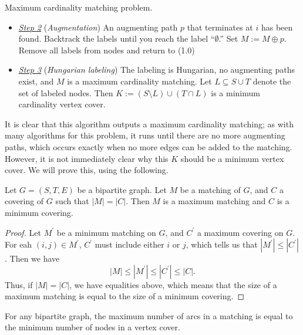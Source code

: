 \documentclass[11pt]{article}
\renewcommand{\'}{^{'}}
\newenvironment{theorem}[2][Theorem]{\begin{trivlist}
\item[\hskip \labelsep {\bfseries #1}\hskip \labelsep {\bfseries #2.}]}{\end{trivlist}}
\newenvironment{lemma}[2][Lemma]{\begin{trivlist}
\item[\hskip \labelsep {\bfseries #1}\hskip \labelsep {\bfseries #2.}]}{\end{trivlist}}
\begin{document}
\begin{section}{Maximum cardinality matching problem.}
\begin{itemize}
\begin{itemize}
		\end{itemize}
	\item \underline{\emph{Step 2}} (\emph{Augmentation})
		  An augmenting path $p$ that terminates at $i$ has been found. Backtrack the 
		  labels until you reach the label ``$\emptyset$.'' Set 
		  $M := M\oplus p$. Remove all labels from nodes and return to (1.0)
	  \item \underline{\emph{Step 3}} (\emph{Hungarian labeling})
		  The labeling is Hungarian, no augmenting paths exist, and $M$ is a 
		  maximum cardinality matching. Let $L\subseteq S\cup T$ denote the set 
		  of labeled nodes. Then $K := (S\setminus L) \cup (T\cap L)$ is a minimum 
		  cardinality vertex cover. 
\end{itemize}

It is clear that this algorithm outputs a maximum cardinality matching; as with many 
algorithms for this problem, it runs until there are no more augmenting paths, which 
occurs exactly when no more edges can be added to the matching. However, it is not 
immediately clear why this $K$ should be a minimum vertex cover. We will prove this, 
using the following.

\begin{lemma}{}
	Let $G = (S, T, E)$ be a bipartite graph. Let $M$ be a matching of $G$, and $C$ a 
	covering of $G$ such that $|M| = |C|$. Then $M$ is a maximum matching and $C$ is a 
	minimum covering.
\end{lemma}

\begin{proof}
	Let $M^{'}$ be a minimum matching on $G$, and $C^{'}$ a maximum covering on $G$. 
	For eah $(i,j)\in M^{'}$, $C^{'}$ must include either $i$ or $j$, which tells 
	us that $|M^{'}| \leq |C^{'}|$. Then we have 
	\[
		|M|\leq |M^{'}| \leq |C^{'}|\leq |C|.
	\]
	Thus, if $|M| = |C|$, we have equalities above, which means that the size of 
	a maximum matching is equal to the size of a minimum covering.
\end{proof}

\begin{theorem}{(K\H{o}nig-Egervary)}
	For any bipartite graph, the maximum number of arcs in a matching is equal to 
	the minimum number of nodes in a vertex cover.
\end{theorem}


\end{section}
\end{document}
